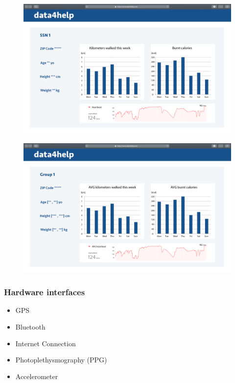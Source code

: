 \documentclass{article}
\begin{document}
\begin{figure}[h!]
\centering
    \textbf{}\par\medskip
	\includegraphics[width= \linewidth]{6userprofile.png}
\end{figure}\newpage
\begin{figure}[h!]
\centering
    \textbf{}\par\medskip
	\includegraphics[width= \linewidth]{7groupprofile.png}
\end{figure}\newpage
\subsubsection{Hardware interfaces}
\begin{itemize}
	\item GPS
	\item Bluetooth
	\item Internet Connection
	\item Photoplethysmography (PPG)
	\item Accelerometer
\end{itemize}
\end{document}

